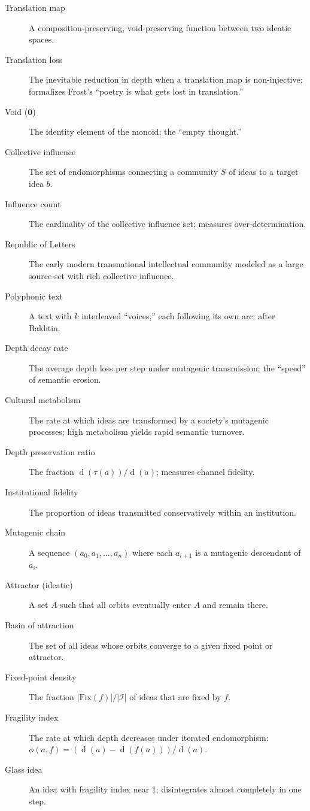 \documentclass[11pt,openany]{book}
\theoremstyle{definition}
\theoremstyle{plain}
\theoremstyle{remark}
\newcommand{\IS}{\mathcal{I}}               %
\newcommand{\void}{\mathbf{0}}              %
\newcommand{\depth}{\operatorname{d}}       %
\newcommand{\transmit}{\tau}                 %
\begin{document}
\begin{description}
\item[Translation map] A composition-preserving, void-preserving function between two ideatic spaces.
\item[Translation loss] The inevitable reduction in depth when a translation map is non-injective; formalizes Frost's ``poetry is what gets lost in translation.''
\item[Void ($\void$)] The identity element of the monoid; the ``empty thought.''
\item[Collective influence] The set of endomorphisms connecting a community $S$ of ideas to a target idea $b$.
\item[Influence count] The cardinality of the collective influence set; measures over-determination.
\item[Republic of Letters] The early modern transnational intellectual community modeled as a large source set with rich collective influence.
\item[Polyphonic text] A text with $k$ interleaved ``voices,'' each following its own arc; after Bakhtin.
\item[Depth decay rate] The average depth loss per step under mutagenic transmission; the ``speed'' of semantic erosion.
\item[Cultural metabolism] The rate at which ideas are transformed by a society's mutagenic processes; high metabolism yields rapid semantic turnover.
\item[Depth preservation ratio] The fraction $\depth(\transmit(a))/\depth(a)$; measures channel fidelity.
\item[Institutional fidelity] The proportion of ideas transmitted conservatively within an institution.
\item[Mutagenic chain] A sequence $(a_0, a_1, \ldots, a_n)$ where each $a_{i+1}$ is a mutagenic descendant of $a_i$.
\item[Attractor (ideatic)] A set $A$ such that all orbits eventually enter $A$ and remain there.
\item[Basin of attraction] The set of all ideas whose orbits converge to a given fixed point or attractor.
\item[Fixed-point density] The fraction $|\mathrm{Fix}(f)|/|\IS|$ of ideas that are fixed by $f$.
\item[Fragility index] The rate at which depth decreases under iterated endomorphism: $\phi(a,f) = (\depth(a) - \depth(f(a)))/\depth(a)$.
\item[Glass idea] An idea with fragility index near 1; disintegrates almost completely in one step.

\end{description}
\end{document}
